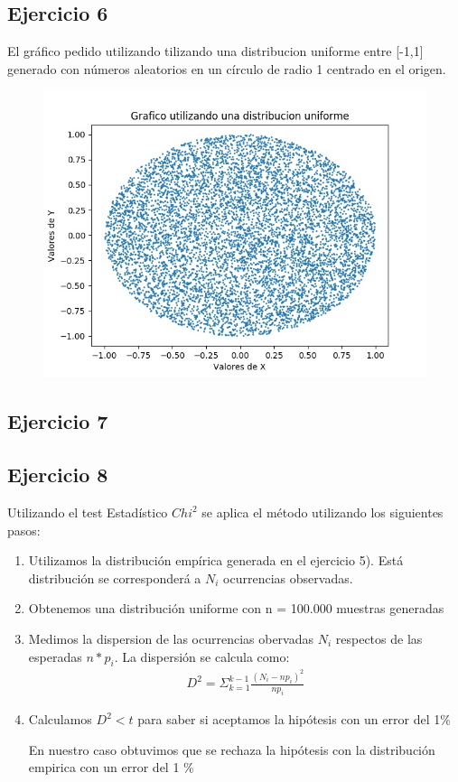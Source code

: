 \documentclass[11pt,a4paper]{article}
\begin{document}
	\subsection{Ejercicio 6}
		El gráfico pedido utilizando tilizando una distribucion uniforme entre [-1,1] generado con números aleatorios en un círculo de radio 1 centrado en el origen.
		\begin{figure}[H]
  			\centering
    			\includegraphics[width=14cm]{imagenes/histogramaEjer6}
		\end{figure}

	\subsection{Ejercicio 7}


	\subsection{Ejercicio 8}
	Utilizando el test Estadístico $Chi^2$ se aplica el método utilizando los siguientes pasos:
	\begin{enumerate}
		\item Utilizamos la distribución empírica generada en el ejercicio 5). Está distribución se corresponderá a $N_i$ ocurrencias observadas.
		\item Obtenemos una distribución uniforme con n = 100.000 muestras generadas
		\item Medimos la dispersion de las ocurrencias obervadas $N_i$ respectos de las esperadas $n*p_i$. La dispersión se calcula como:
		\begin{align*}
		D^2 = \Sigma_{k=1}^{k-1} \frac{(N_i - np_i)^2}{np_i}
		\end{align*}
		\item Calculamos $D^2 < t$ para saber si aceptamos la hipótesis  con un error del 1\%
		
		En nuestro caso obtuvimos que se rechaza la hipótesis con la distribución empirica con un error del 1 \%
	\end{enumerate}
\end{document}
